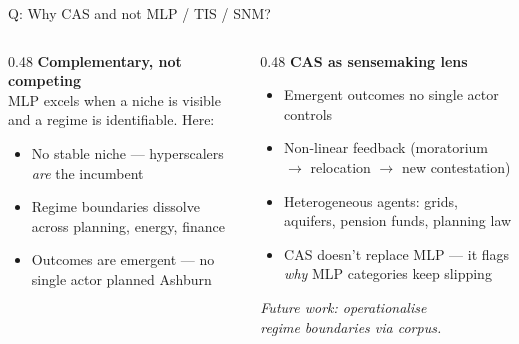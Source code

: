 \documentclass[aspectratio=169,11pt]{beamer}
\begin{document}
\begin{frame}[noframenumbering]{\enspace Q: Why CAS and not MLP / TIS / SNM?}
\begin{columns}[T]
\begin{column}{0.48\textwidth}
  \small\textbf{Complementary, not competing}\\[0.4em]
  \footnotesize
  MLP excels when a niche is visible and a regime is identifiable. Here:
  \begin{itemize}
    \item No stable niche — hyperscalers \textit{are} the incumbent
    \item Regime boundaries dissolve across planning, energy, finance
    \item Outcomes are emergent — no single actor planned Ashburn
  \end{itemize}
\end{column}
\begin{column}{0.48\textwidth}
  \small\textbf{CAS as sensemaking lens}\\[0.4em]
  \footnotesize
  \begin{itemize}
    \item Emergent outcomes no single actor controls
    \item Non-linear feedback (moratorium $\to$ relocation $\to$ new contestation)
    \item Heterogeneous agents: grids, aquifers, pension funds, planning law
    \item CAS doesn't replace MLP — it flags \textit{why} MLP categories keep slipping
  \end{itemize}
  \textcolor{dcgray}{\textit{Future work: operationalise\\regime boundaries via corpus.}}
\end{column}
\end{columns}
\end{frame}
\end{document}
